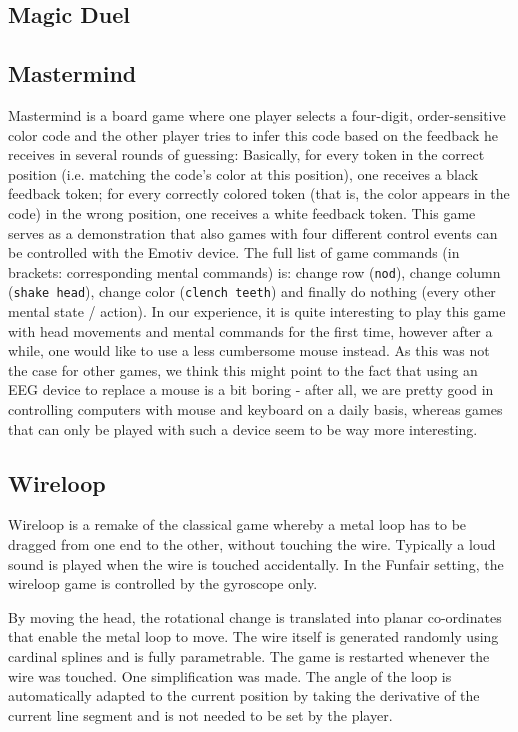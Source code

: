 \documentclass{utue} %
\begin{document}
\subsection{Magic Duel}


\subsection{Mastermind}
Mastermind is a board game where one player selects a four-digit, order-sensitive color code and the other player tries to infer this code based on the feedback he receives in several rounds of guessing: Basically, for every token in the correct position (i.e. matching the code's color at this position), one receives a black feedback token; for every correctly colored token (that is, the color appears in the code) in the wrong position, one receives a white feedback token. This game serves as a demonstration that also games with four different control events can be controlled with the Emotiv device. The full list of game commands (in brackets: corresponding mental commands) is: change row (\texttt{nod}), change column (\texttt{shake head}), change color (\texttt{clench teeth}) and finally do nothing (every other mental state / action). In our experience, it is quite interesting to play this game with head movements and mental commands for the first time, however after a while, one would like to use a less cumbersome mouse instead. As this was not the case for other games, we think this might point to the fact that using an EEG device to replace a mouse is a bit boring - after all, we are pretty good in controlling computers with mouse and keyboard on a daily basis, whereas games that can only be played with such a device seem to be way more interesting.


\subsection{Wireloop}
Wireloop is a remake of the classical game whereby a metal loop has to be dragged from one end to the other, without touching the wire. Typically a loud sound is played when the wire is touched accidentally. In the Funfair setting, the wireloop game is controlled by the gyroscope only.

By moving the head, the rotational change is translated into planar co-ordinates that enable the metal loop to move. The wire itself is generated randomly using cardinal splines and is fully parametrable. The game is restarted whenever the wire was touched. One simplification was made. The angle of the loop is automatically adapted to the current position by taking the derivative of the current line segment and is not needed to be set by the player.
\end{document}
